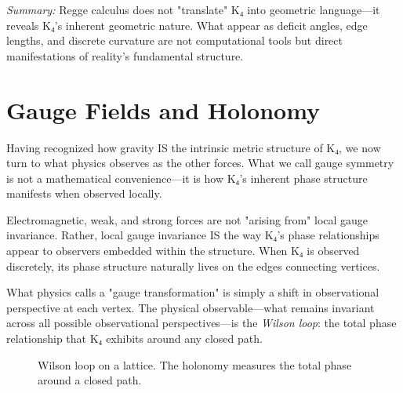 \documentclass[11pt,a4paper]{book}
\begin{document}
\medskip
\noindent\textit{Summary:} Regge calculus does not "translate" K₄ into geometric language—it reveals K₄'s inherent geometric nature. What appear as deficit angles, edge lengths, and discrete curvature are not computational tools but direct manifestations of reality's fundamental structure.

\chapter{Gauge Fields and Holonomy}

Having recognized how gravity IS the intrinsic metric structure of K₄, we now turn to what physics observes as the other forces. What we call gauge symmetry is not a mathematical convenience—it is how K₄'s inherent phase structure manifests when observed locally.

Electromagnetic, weak, and strong forces are not "arising from" local gauge invariance. Rather, local gauge invariance IS the way K₄'s phase relationships appear to observers embedded within the structure. When K₄ is observed discretely, its phase structure naturally lives on the edges connecting vertices.

What physics calls a "gauge transformation" is simply a shift in observational perspective at each vertex. The physical observable—what remains invariant across all possible observational perspectives—is the \emph{Wilson loop}: the total phase relationship that K₄ exhibits around any closed path.

\begin{figure}[h]
\centering
{}
\caption{Wilson loop on a lattice. The holonomy measures the total phase around a closed path.}
\label{fig:wilson-loop}
\end{figure}
\end{document}
